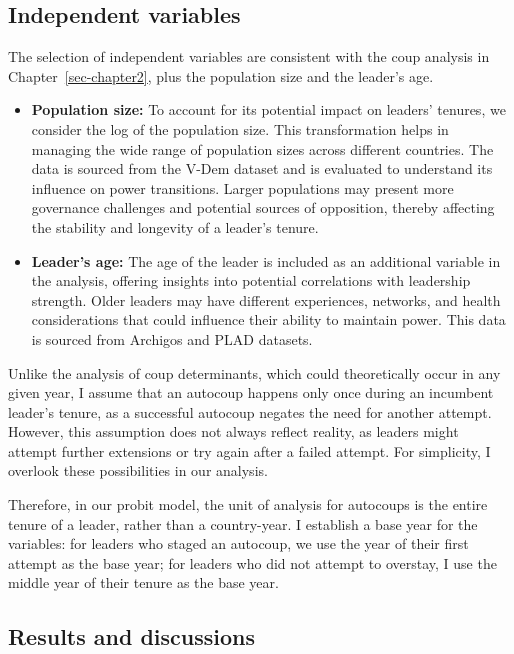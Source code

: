 \documentclass[
  12pt,
]{report}
\begin{document}
\subsection{Independent variables}\label{independent-variables}

The selection of independent variables are consistent with the coup
analysis in Chapter~\ref{sec-chapter2}, plus the population size and the
leader's age.

\begin{itemize}
\item
  \textbf{Population size:} To account for its potential impact on
  leaders' tenures, we consider the log of the population size. This
  transformation helps in managing the wide range of population sizes
  across different countries. The data is sourced from the V-Dem dataset
  and is evaluated to understand its influence on power transitions.
  Larger populations may present more governance challenges and
  potential sources of opposition, thereby affecting the stability and
  longevity of a leader's tenure.
\item
  \textbf{Leader's age:} The age of the leader is included as an
  additional variable in the analysis, offering insights into potential
  correlations with leadership strength. Older leaders may have
  different experiences, networks, and health considerations that could
  influence their ability to maintain power. This data is sourced from
  Archigos and PLAD datasets.
\end{itemize}

Unlike the analysis of coup determinants, which could theoretically
occur in any given year, I assume that an autocoup happens only once
during an incumbent leader's tenure, as a successful autocoup negates
the need for another attempt. However, this assumption does not always
reflect reality, as leaders might attempt further extensions or try
again after a failed attempt. For simplicity, I overlook these
possibilities in our analysis.

Therefore, in our probit model, the unit of analysis for autocoups is
the entire tenure of a leader, rather than a country-year. I establish a
base year for the variables: for leaders who staged an autocoup, we use
the year of their first attempt as the base year; for leaders who did
not attempt to overstay, I use the middle year of their tenure as the
base year.

\subsection{Results and discussions}\label{results-and-discussions}
\end{document}
